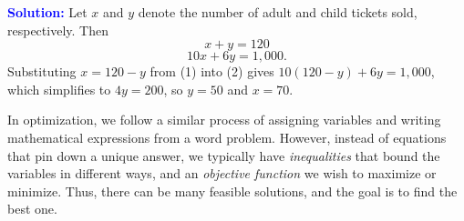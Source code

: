 \smallskip

\noindent \textbf{\textcolor{blue}{Solution:}} Let $x$ and $y$ denote the number of adult and child tickets sold, respectively. Then
\[
x + y = 120 \tag{1}
\]
\[
10x + 6y = 1{,}000. \tag{2}
\]
Substituting $x = 120 - y$ from (1) into (2) gives $10(120-y) + 6y = 1{,}000$, which simplifies to $4y = 200$, so $y = 50$ and $x = 70$.

\smallskip

In optimization, we follow a similar process of assigning variables and writing mathematical expressions from a word problem. However, instead of equations that pin down a unique answer, we typically have \emph{inequalities} that bound the variables in different ways, and an \emph{objective function} we wish to maximize or minimize. Thus, there can be many feasible solutions, and the goal is to find the best one.

